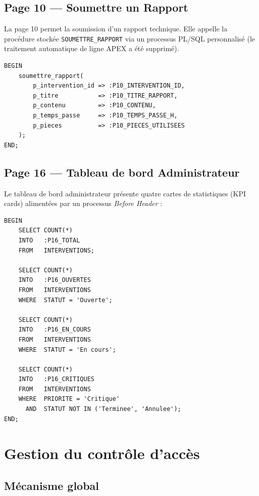 \documentclass[12pt,a4paper,oneside]{report}
\begin{document}
\subsection{Page 10 — Soumettre un Rapport}

La page 10 permet la soumission d'un rapport technique. Elle appelle la procédure stockée \texttt{SOUMETTRE\_RAPPORT} via un processus PL/SQL personnalisé (le traitement automatique de ligne APEX a été supprimé).

\begin{lstlisting}[language=PLSQL, caption=Appel de la procédure dans le processus APEX]
BEGIN
    soumettre_rapport(
        p_intervention_id => :P10_INTERVENTION_ID,
        p_titre           => :P10_TITRE_RAPPORT,
        p_contenu         => :P10_CONTENU,
        p_temps_passe     => :P10_TEMPS_PASSE_H,
        p_pieces          => :P10_PIECES_UTILISEES
    );
END;
\end{lstlisting}

\subsection{Page 16 — Tableau de bord Administrateur}

Le tableau de bord administrateur présente quatre cartes de statistiques (KPI cards) alimentées par un processus \textit{Before Header} :

\begin{lstlisting}[language=PLSQL, caption=Processus Before Header du tableau de bord administrateur]
BEGIN
    SELECT COUNT(*)
    INTO   :P16_TOTAL
    FROM   INTERVENTIONS;

    SELECT COUNT(*)
    INTO   :P16_OUVERTES
    FROM   INTERVENTIONS
    WHERE  STATUT = 'Ouverte';

    SELECT COUNT(*)
    INTO   :P16_EN_COURS
    FROM   INTERVENTIONS
    WHERE  STATUT = 'En cours';

    SELECT COUNT(*)
    INTO   :P16_CRITIQUES
    FROM   INTERVENTIONS
    WHERE  PRIORITE = 'Critique'
      AND  STATUT NOT IN ('Terminee', 'Annulee');
END;
\end{lstlisting}

\section{Gestion du contrôle d'accès}

\subsection{Mécanisme global}
\end{document}
